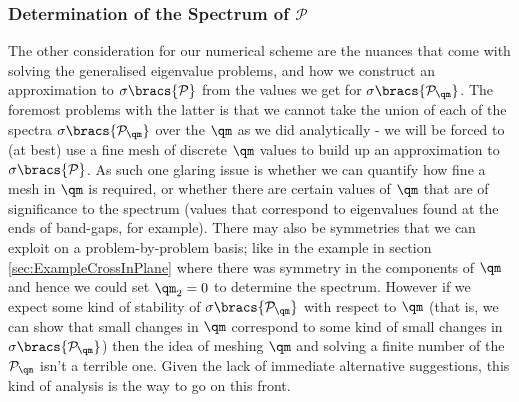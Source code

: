 \subsubsection{Determination of the Spectrum of $\mathcal{P}$} \label{sec:ConcFutureGetSpectrum}
The other consideration for our numerical scheme are the nuances that come with solving the generalised eigenvalue problems, and how we construct an approximation to $\sigma\bracs{\mathcal{P}}$ from the values we get for $\sigma\bracs{\mathcal{P}_{\qm}}$.
The foremost problems with the latter is that we cannot take the union of each of the spectra $\sigma\bracs{\mathcal{P}_{\qm}}$ over the $\qm$ as we did analytically - we will be forced to (at best) use a fine mesh of discrete $\qm$ values to build up an approximation to $\sigma\bracs{\mathcal{P}}$.
As such one glaring issue is whether we can quantify how fine a mesh in $\qm$ is required, or whether there are certain values of $\qm$ that are of significance to the spectrum (values that correspond to eigenvalues found at the ends of band-gaps, for example).
There may also be symmetries that we can exploit on a problem-by-problem basis; like in the example in section \ref{sec:ExampleCrossInPlane} where there was symmetry in the components of $\qm$ and hence we could set $\qm_2=0$ to determine the spectrum.
However if we expect some kind of stability of $\sigma\bracs{\mathcal{P}_{\qm}}$ with respect to $\qm$ (that is, we can show that small changes in $\qm$ correspond to some kind of small changes in $\sigma\bracs{\mathcal{P}_{\qm}}$) then the idea of meshing $\qm$ and solving a finite number of the $\mathcal{P}_{\qm}$ isn't a terrible one.
Given the lack of immediate alternative suggestions, this kind of analysis is the way to go on this front. \newline

